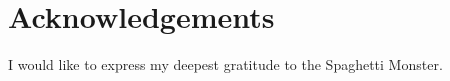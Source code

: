 \chapter{Acknowledgements}
\label{ch:acknowledgements}

I would like to express my deepest gratitude to the Spaghetti Monster.


